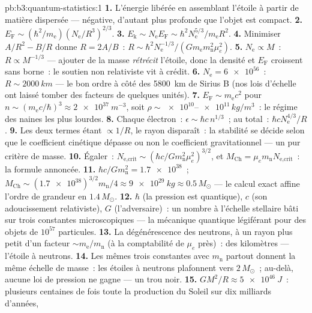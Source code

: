 \begin{solution}{pb:b3:quantum-statistics:1}
\textbf{1.} L'énergie libérée en assemblant l'étoile à partir de
matière dispersée --- négative, d'autant plus profonde que l'objet
est compact.
\textbf{2.} $E_{\text{F}} \sim (\hbar^2/m_{\text{e}})
(N_{\text{e}}/R^3)^{2/3}$.
\textbf{3.} $E_{\text{k}} \sim N_{\text{e}}E_{\text{F}} \sim
\hbar^2N_{\text{e}}^{5/3}/m_{\text{e}}R^2$.
\textbf{4.} Minimiser $A/R^2 - B/R$ donne $R = 2A/B$~: $R \sim
\hbar^2N_{\text{e}}^{-1/3}/(Gm_{\text{e}}m_{\text{n}}^2\mu_e^2)$.
\textbf{5.} $N_{\text{e}} \propto M$~: $R \propto M^{-1/3}$ ---
ajouter de la masse \emph{rétrécit} l'étoile, donc la densité et
$E_{\text{F}}$ croissent sans borne~: le soutien non relativiste vit
à crédit.
\textbf{6.} $N_{\text{e}} = \num{6e56}$~: $R \sim \qty{2000}{km}$
--- le bon ordre à côté des \qty{5800}{km} de Sirius B (nos lois
d'échelle ont laissé tomber des facteurs de quelques unités).
\textbf{7.} $E_{\text{F}} \sim m_{\text{e}}c^2$ pour $n \sim
(m_{\text{e}}c/\hbar)^3 \approx \qty{2e37}{m^{-3}}$, soit $\rho
\sim \num{e10}$--$\num{e11}\,\unit{kg/m^3}$~: le régime des naines
les plus lourdes.
\textbf{8.} Chaque électron~: $\epsilon \sim \hbar c\,n^{1/3}$~;
au total~: $\hbar cN_{\text{e}}^{4/3}/R$.
\textbf{9.} Les deux termes étant $\propto 1/R$, le rayon
disparaît~: la stabilité se décide selon que le coefficient
cinétique dépasse ou non le coefficient gravitationnel --- un pur
critère de masse.
\textbf{10.} Égaler~: $N_{\text{e,crit}} \sim (\hbar c/
Gm_{\text{n}}^2\mu_e^2)^{3/2}$, et $M_{\text{Ch}} =
\mu_em_{\text{n}}N_{\text{e,crit}}$~: la formule annoncée.
\textbf{11.} $\hbar c/Gm_{\text{n}}^2 = \num{1.7e38}$~;
$M_{\text{Ch}} \sim (\num{1.7e38})^{3/2}m_{\text{n}}/4 \approx
\qty{9e29}{kg} \approx 0.5\,M_\odot$ --- le calcul exact affine
l'ordre de grandeur en $1.4\,M_\odot$.
\textbf{12.} $\hbar$ (la pression est quantique), $c$ (son
adoucissement relativiste), $G$ (l'adversaire)~: un nombre à
l'échelle stellaire bâti sur trois constantes microscopiques --- la
mécanique quantique légiférant pour des objets de $10^{57}$
particules.
\textbf{13.} La dégénérescence des neutrons, à un rayon plus petit
d'un facteur $\sim m_{\text{e}}/m_{\text{n}}$ (à la comptabilité de
$\mu_e$ près)~: des kilomètres --- l'étoile à neutrons.
\textbf{14.} Les mêmes trois constantes avec $m_{\text{n}}$ partout
donnent la même échelle de masse~: les étoiles à neutrons plafonnent
vers $2\,M_\odot$~; au-delà, aucune loi de pression ne gagne --- un
trou noir.
\textbf{15.} $GM^2/R \approx \qty{5e46}{J}$~: plusieurs centaines de
fois toute la production du Soleil sur dix milliards d'années,

\end{solution}
